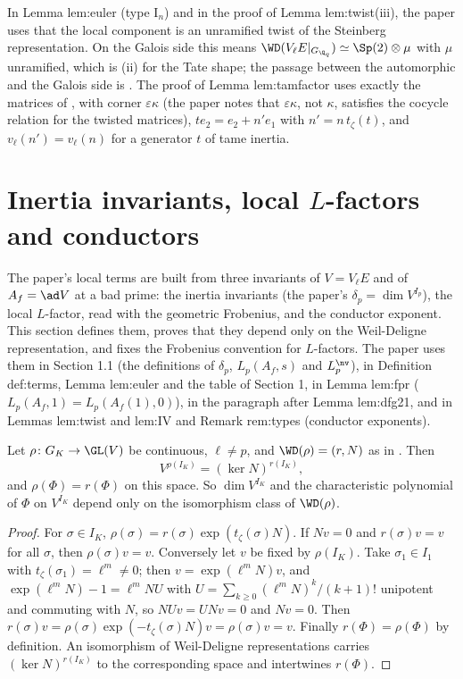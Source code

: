 \begin{paperlink}\label{pl:local:steinberg}
In Lemma lem:euler (type $\mathrm{I}_n$) and in the proof of Lemma lem:twist(iii), the paper uses that the local component is an unramified twist of the Steinberg
representation. On the Galois side this means $\WD(V_\ell E|_{G_{\Q_q}})\simeq\Sp(2)\otimes\mu$ with $\mu$ unramified, which is (ii) for the Tate
shape; the passage between the automorphic and the Galois side is . The proof of Lemma lem:tamfactor uses exactly the matrices of
, with corner $\varepsilon\kappa$ (the paper notes that $\varepsilon\kappa$, not $\kappa$, satisfies the cocycle relation for
the twisted matrices), $te_2=e_2+n'e_1$ with
$n'=n\,t_\zeta(t)$, and $v_\ell(n')=v_\ell(n)$ for a generator $t$ of tame inertia.
\end{paperlink}

\section{Inertia invariants, local \texorpdfstring{$L$}{L}-factors and conductors}\label{sec:local:L}

The paper's local terms are built from three invariants of $V=V_\ell E$ and of $A_f=\ad V$ at a bad prime: the inertia invariants (the paper's
$\delta_p=\dim V^{I_p}$), the local $L$-factor, read with the geometric Frobenius, and the conductor exponent. This section defines them, proves that
they depend only on the Weil-Deligne representation, and fixes the Frobenius convention for $L$-factors. The paper uses them in Section 1.1 (the
definitions of $\delta_p$, $L_p(A_f,s)$ and $L^{\nv}_p$), in Definition def:terms, Lemma lem:euler and the table of Section 1, in Lemma lem:fpr
($L_p(A_f,1)=L_p(A_f(1),0)$), in the paragraph after Lemma lem:dfg21, and in Lemmas lem:twist and lem:IV and Remark rem:types (conductor exponents).

\begin{proposition}\label{prop:local:invariants}
Let $\rho\colon G_K\to\GL(V)$ be continuous, $\ell\ne p$, and $\WD(\rho)=(r,N)$ as in . Then
\[
V^{\rho(I_K)}=(\ker N)^{r(I_K)},
\]
and $\rho(\Phi)=r(\Phi)$ on this space. So $\dim V^{I_K}$ and the characteristic polynomial of $\Phi$ on $V^{I_K}$ depend only on the isomorphism class of $\WD(\rho)$.
\end{proposition}

\begin{proof}
For $\sigma\in I_K$, $\rho(\sigma)=r(\sigma)\exp(t_\zeta(\sigma)N)$. If $Nv=0$ and $r(\sigma)v=v$ for all $\sigma$, then $\rho(\sigma)v=v$. Conversely let $v$ be fixed by $\rho(I_K)$. Take
$\sigma_1\in I_1$ with $t_\zeta(\sigma_1)=\ell^m\ne0$; then $v=\exp(\ell^mN)v$, and $\exp(\ell^mN)-1=\ell^mNU$ with $U=\sum_{k\ge0}(\ell^mN)^k/(k+1)!$ unipotent and commuting with $N$, so
$NUv=UNv=0$ and $Nv=0$. Then $r(\sigma)v=\rho(\sigma)\exp(-t_\zeta(\sigma)N)v=\rho(\sigma)v=v$. Finally $r(\Phi)=\rho(\Phi)$ by definition. An isomorphism of Weil-Deligne representations
carries $(\ker N)^{r(I_K)}$ to the corresponding space and intertwines $r(\Phi)$.
\end{proof}

